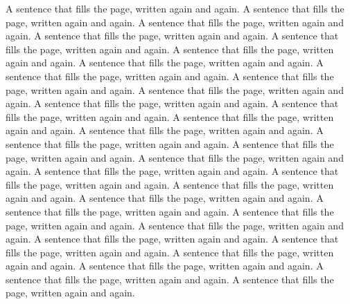 \documentclass{article}
\begin{document}
A sentence that fills the page, written again and again. A sentence that fills the page, written again
and again. A sentence that fills the page, written again and again. A sentence that fills the page, written
again and again. A sentence that fills the page, written again and again. A sentence that fills the page,
written again and again. A sentence that fills the page, written again and again. A sentence that fills
the page, written again and again. A sentence that fills the page, written again and again. A sentence
that fills the page, written again and again. A sentence that fills the page, written again and again.
A sentence that fills the page, written again and again. A sentence that fills the page, written again
and again. A sentence that fills the page, written again and again. A sentence that fills the page, written
again and again. A sentence that fills the page, written again and again. A sentence that fills the page,
written again and again. A sentence that fills the page, written again and again. A sentence that fills
the page, written again and again. A sentence that fills the page, written again and again. A sentence
that fills the page, written again and again. A sentence that fills the page, written again and again.
A sentence that fills the page, written again and again. A sentence that fills the page, written again
and again. A sentence that fills the page, written again and again. A sentence that fills the page, written
again and again. A sentence that fills the page, written again and again. A sentence that fills the page,
written again and again. A sentence that fills the page, written again and again. A sentence that fills
the page, written again and again.
\end{document}
